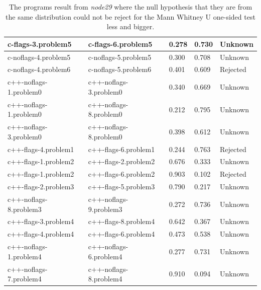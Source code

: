 \begin{appendices}
\begin{table}[h]
\begin{adjustbox}{height=0.5\textheight}
\begin{tabular}{|l|l|l|l|l|}
c-flags-3.problem5 & c-flags-6.problem5 & 0.278 & 0.730 & Unknown\\ \hline
c-noflags-4.problem5 & c-noflags-5.problem5 & 0.300 & 0.708 & Unknown\\ \hline
c-noflags-4.problem6 & c-noflags-5.problem6 & 0.401 & 0.609 & Rejected\\ \hline
c++-noflags-1.problem0 & c++-noflags-3.problem0 & 0.340 & 0.669 & Unknown\\ \hline
c++-noflags-1.problem0 & c++-noflags-8.problem0 & 0.212 & 0.795 & Unknown\\ \hline
c++-noflags-3.problem0 & c++-noflags-8.problem0 & 0.398 & 0.612 & Unknown\\ \hline
c++-flags-4.problem1 & c++-flags-6.problem1 & 0.244 & 0.763 & Rejected\\ \hline
c++-flags-1.problem2 & c++-flags-2.problem2 & 0.676 & 0.333 & Unknown\\ \hline
c++-flags-1.problem2 & c++-flags-6.problem2 & 0.903 & 0.102 & Rejected\\ \hline
c++-flags-2.problem3 & c++-flags-5.problem3 & 0.790 & 0.217 & Unknown\\ \hline
c++-noflags-8.problem3 & c++-noflags-9.problem3 & 0.272 & 0.736 & Unknown\\ \hline
c++-flags-3.problem4 & c++-flags-8.problem4 & 0.642 & 0.367 & Unknown\\ \hline
c++-flags-4.problem4 & c++-flags-6.problem4 & 0.473 & 0.538 & Unknown\\ \hline
c++-noflags-1.problem4 & c++-noflags-6.problem4 & 0.277 & 0.731 & Unknown\\ \hline
c++-noflags-7.problem4 & c++-noflags-8.problem4 & 0.910 & 0.094 & Unknown\\ \hline
\end{tabular}
\end{adjustbox}
\caption{The programs result from \textit{node29} where the null hypothesis that they are from the same distribution could not be reject for the Mann Whitney U one-sided test less and bigger.}
\label{tab:programs_equal2}
\end{table}



\end{appendices}
